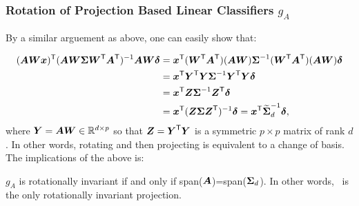 \documentclass[10pt]{article}
\begin{document}








\subsubsection{Rotation of Projection Based Linear Classifiers $g_A$}

By a similar arguement as above, one can easily show that:
% 

\begin{align*}	
(\bA  \bW \bx) \T  (\bA \bW  \bSig  \bW\T \bA\T)^{-1} \bA \bW \bdel 
&= \bx\T (\bW\T \bA\T) (\bA \bW) \bSig^{-1} (\bW\T \bA\T) (\bA \bW) \bdel \\
&= \bx\T \bY\T \bY \bSig^{-1} \bY\T \bY \bdel \\
&= \bx\T \bZ \bSig^{-1} \bZ\T \bdel \\
&= \bx\T (\bZ \bSig \bZ\T)^{-1} \bdel = \bx\T \mt{\bSig}_d^{-1} \bdel,
\end{align*}
where $\bY = \bA \bW \in \Real^{d \times p}$ so that $\bZ=\bY\T \bY$ is a symmetric ${p \times p}$ matrix of rank $d$.  In other words, rotating and then projecting is equivalent to a change of basis.
The implications of the above is: 
\begin{lem}
$g_A$ is rotationally invariant if and only if span($\bA$)=span($\bSig_d$).
In other words, \Pca~is the only rotationally invariant projection.
\end{lem}
\end{document}
